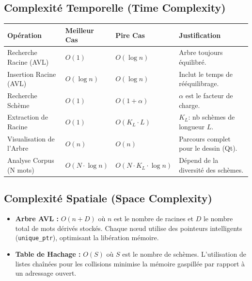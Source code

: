 \documentclass[12pt,a4paper]{article}
\begin{document}
\subsection{Complexité Temporelle (Time Complexity)}
\begin{table}[h]
	\centering
	\small
	\begin{tabular}{|l|l|l|l|}
		\hline
		\textbf{Opération}       & \textbf{Meilleur Cas} & \textbf{Pire Cas}             & \textbf{Justification}                \\
		\hline
		Recherche Racine (AVL)   & $O(1)$                & $O(\log n)$                   & Arbre toujours équilibré.             \\
		\hline
		Insertion Racine (AVL)   & $O(\log n)$           & $O(\log n)$                   & Inclut le temps de rééquilibrage.     \\
		\hline
		Recherche Schème         & $O(1)$                & $O(1 + \alpha)$               & $\alpha$ est le facteur de charge.    \\
		\hline
		Extraction de Racine     & $O(1)$                & $O(K_L \cdot L)$              & $K_L$: nb schèmes de longueur $L$.    \\
		\hline
		Visualisation de l'Arbre & $O(n)$                & $O(n)$                        & Parcours complet pour le dessin (Qt). \\
		\hline
		Analyse Corpus (N mots)  & $O(N \cdot \log n)$   & $O(N \cdot K_L \cdot \log n)$ & Dépend de la diversité des schèmes.   \\
		\hline
	\end{tabular}
\end{table}

\subsection{Complexité Spatiale (Space Complexity)}
\begin{itemize}
	\item \textbf{Arbre AVL :} $O(n + D)$ où $n$ est le nombre de racines et $D$ le nombre total de mots dérivés stockés. Chaque nœud utilise des pointeurs intelligents (\texttt{unique\_ptr}), optimisant la libération mémoire.
	\item \textbf{Table de Hachage :} $O(S)$ où $S$ est le nombre de schèmes. L'utilisation de listes chaînées pour les collisions minimise la mémoire gaspillée par rapport à un adressage ouvert.
\end{itemize}
\end{document}
